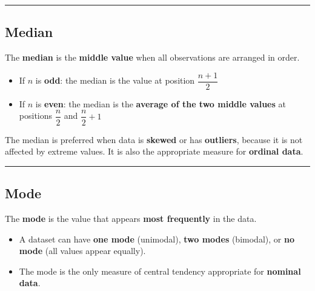 \documentclass[
  12pt,
  letterpaper,
]{book}
\providecommand{\tightlist}{%
  \setlength{\itemsep}{0pt}\setlength{\parskip}{0pt}}
\begin{document}
\begin{center}\rule{0.5\linewidth}{0.5pt}\end{center}

\subsection{Median}\label{median}

The \textbf{median} is the \textbf{middle value} when all observations
are arranged in order.

\begin{itemize}
\tightlist
\item
  If \(n\) is \textbf{odd}: the median is the value at position
  \(\dfrac{n+1}{2}\)
\item
  If \(n\) is \textbf{even}: the median is the \textbf{average of the
  two middle values} at positions \(\dfrac{n}{2}\) and
  \(\dfrac{n}{2}+1\)
\end{itemize}

\begin{tcolorbox}[enhanced jigsaw, arc=.35mm, bottomrule=.15mm, bottomtitle=1mm, breakable, colback=white, colbacktitle=quarto-callout-warning-color!10!white, colframe=quarto-callout-warning-color-frame, coltitle=black, left=2mm, leftrule=.75mm, opacityback=0, opacitybacktitle=0.6, rightrule=.15mm, title={⚠️ When to Use the Median}, titlerule=0mm, toprule=.15mm, toptitle=1mm]

The median is preferred when data is \textbf{skewed} or has
\textbf{outliers}, because it is not affected by extreme values. It is
also the appropriate measure for \textbf{ordinal data}.

\end{tcolorbox}

\begin{center}\rule{0.5\linewidth}{0.5pt}\end{center}

\subsection{Mode}\label{mode}

The \textbf{mode} is the value that appears \textbf{most frequently} in
the data.

\begin{itemize}
\tightlist
\item
  A dataset can have \textbf{one mode} (unimodal), \textbf{two modes}
  (bimodal), or \textbf{no mode} (all values appear equally).
\item
  The mode is the only measure of central tendency appropriate for
  \textbf{nominal data}.
\end{itemize}
\end{document}
